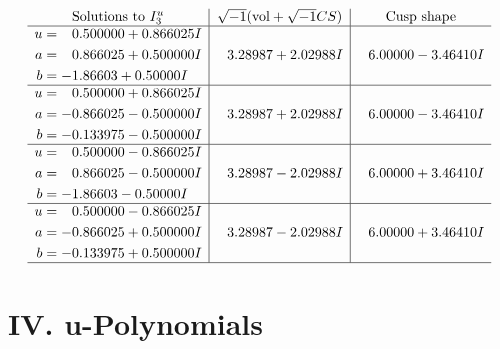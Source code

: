 \documentclass[1p]{elsarticle_modified}
\theoremstyle{definition}
\newcommand{\I}{\sqrt{-1}}
\begin{document}
$$\begin{array}{c|c|c}  
\text{Solutions to }I^u_{3}& \I (\text{vol} + \sqrt{-1}CS) & \text{Cusp shape}\\
 \hline 
\begin{aligned}
u &= \phantom{-}0.500000 + 0.866025 I \\
a &= \phantom{-}0.866025 + 0.500000 I \\
b &= -1.86603 + 0.50000 I\end{aligned}
 & \phantom{-}3.28987 + 2.02988 I & \phantom{-}6.00000 - 3.46410 I \\ \hline\begin{aligned}
u &= \phantom{-}0.500000 + 0.866025 I \\
a &= -0.866025 - 0.500000 I \\
b &= -0.133975 - 0.500000 I\end{aligned}
 & \phantom{-}3.28987 + 2.02988 I & \phantom{-}6.00000 - 3.46410 I \\ \hline\begin{aligned}
u &= \phantom{-}0.500000 - 0.866025 I \\
a &= \phantom{-}0.866025 - 0.500000 I \\
b &= -1.86603 - 0.50000 I\end{aligned}
 & \phantom{-}3.28987 - 2.02988 I & \phantom{-}6.00000 + 3.46410 I \\ \hline\begin{aligned}
u &= \phantom{-}0.500000 - 0.866025 I \\
a &= -0.866025 + 0.500000 I \\
b &= -0.133975 + 0.500000 I\end{aligned}
 & \phantom{-}3.28987 - 2.02988 I & \phantom{-}6.00000 + 3.46410 I\\
 \hline 
 \end{array}$$\newpage
\newpage\renewcommand{\arraystretch}{1}
\centering \section*{ IV. u-Polynomials}
\end{document}
